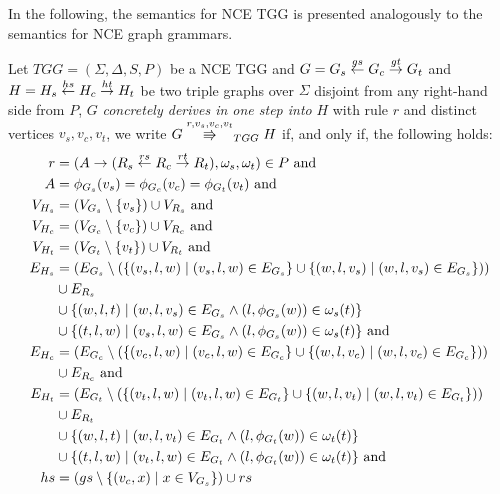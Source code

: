 In the following, the semantics for NCE TGG is presented analogously to the semantics for NCE graph grammars.

\begin{definition}
	\label{def:tgg_dstep}
	Let $TGG = (\Sigma, \Delta, S, P)$ be a NCE TGG and $G = G_s \overset{gs}{\leftarrow} G_c \overset{gt}{\rightarrow} G_t$ and $H = H_s \overset{hs}{\leftarrow} H_c \overset{ht}{\rightarrow} H_t$ be two triple graphs over $\Sigma$ disjoint from any right-hand side from $P$, $G$ \emph{concretely derives in one step into} $H$ with rule $r$ and distinct vertices $v_s, v_c, v_t$, we write $G \tcderiv{r}{v_s,v_c,v_t}{TGG} H$ if, and only if, the following holds:
	\begin{align*}
		r & = (A \pro (R_s \ms{rs} R_c \mt{rt} R_t), \omega_s, \omega_t) \in P \text{ and } \\
		A & = \phi_{G_s}(v_s) = \phi_{G_c}(v_c) = \phi_{G_t}(v_t) \text{ and}\\
		V_{H_s}  & = (V_{G_s} \setminus \{v_s\}) \cup V_{R_s} \text{ and}\\
		V_{H_c}  & = (V_{G_c} \setminus \{v_c\}) \cup V_{R_c} \text{ and}\\
		V_{H_t}  & = (V_{G_t} \setminus \{v_t\}) \cup V_{R_t} \text{ and}\\
		E_{H_s} & = (E_{G_s} \setminus (\{(v_s,l,w) \st (v_s,l,w) \in E_{G_s}\} \cup \{(w,l,v_s) \st (w,l,v_s) \in E_{G_s}\})) \\
		& \cup E_{R_s} \\
		& \cup \{(w,l,t) \st (w,l,v_s) \in E_{G_s} \land (l,\phi_{G_s}(w)) \in \omega_{s}(t)\} \\
		& \cup \{(t,l,w) \st (v_s,l,w) \in E_{G_s} \land (l,\phi_{G_s}(w)) \in \omega_{s}(t)\} \text{ and} \\
		E_{H_c} & = (E_{G_c} \setminus (\{(v_c,l,w) \st (v_c,l,w) \in E_{G_c}\} \cup \{(w,l,v_c) \st (w,l,v_c) \in E_{G_c}\})) \\
		& \cup E_{R_c} \text{ and} \\
		E_{H_t} & = (E_{G_t} \setminus (\{(v_t,l,w) \st (v_t,l,w) \in E_{G_t}\} \cup \{(w,l,v_t) \st (w,l,v_t) \in E_{G_t}\})) \\
		& \cup E_{R_t} \\
		& \cup \{(w,l,t) \st (w,l,v_t) \in E_{G_t} \land (l,\phi_{G_t}(w)) \in \omega_{t}(t)\} \\
		& \cup \{(t,l,w) \st (v_t,l,w) \in E_{G_t} \land (l,\phi_{G_t}(w)) \in \omega_{t}(t)\} \text{ and} \\
		hs		& = (gs \setminus \{(v_c,x) \st x \in V_{G_s}\}) \cup rs  \\

\end{align*}
\end{definition}
